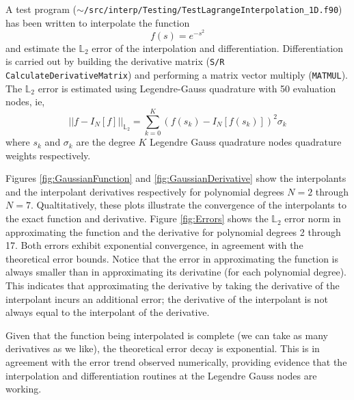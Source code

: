 \documentclass[12pt]{softwaremanual}
\begin{document}
 A test program (\texttt{$\sim$/src/interp/Testing/TestLagrangeInterpolation\_1D.f90}) has been written to interpolate the function 
 \begin{equation}
 f(s) = e^{-s^2}
 \end{equation}
 and estimate the $\mathbb{L}_2$ error of the interpolation and differentiation. Differentiation is carried out by building the derivative matrix (\texttt{S/R CalculateDerivativeMatrix}) and performing a matrix vector multiply (\texttt{MATMUL}). The $\mathbb{L}_2$ error is estimated using Legendre-Gauss quadrature with 50 evaluation nodes, ie, 
 \begin{equation}
 || f - I_N[f] ||_{\mathbb{L}_2} = \sum_{k=0}^K \left( f(s_k) - I_N[f(s_k)] \right)^2 \sigma_k
 \end{equation}
 where $s_k$ and $\sigma_k$ are the degree $K$ Legendre Gauss quadrature nodes quadrature weights respectively. 
 



Figures \ref{fig:GaussianFunction} and \ref{fig:GaussianDerivative} show the interpolants and the interpolant derivatives respectively for polynomial degrees $N=2$ through $N=7$. Qualtitatively, these plots illustrate the convergence of the interpolants to the exact function and derivative. Figure \ref{fig:Errors} shows the $\mathbb{L}_2$ error norm in approximating the function and the derivative for polynomial degrees 2 through 17. Both errors exhibit exponential convergence, in agreement with the theoretical error bounds. Notice that the error in approximating the function is always smaller than in approximating its derivatine (for each polynomial degree). This indicates that approximating the derivative by taking the derivative of the interpolant incurs an additional error; the derivative of the interpolant is not always equal to the interpolant of the derivative.

Given that the function being interpolated is complete (we can take as many derivatives as we like), the theoretical error decay is exponential. This is in agreement with the error trend observed numerically, providing evidence that the interpolation and differentiation routines at the Legendre Gauss nodes are working.

  


\pagebreak


\end{document}

